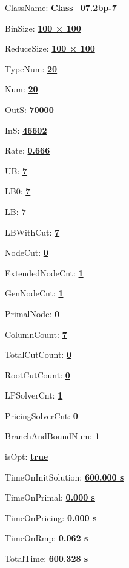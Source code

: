 \documentclass[11pt]{article}
\begin{document}
\pagestyle{empty}


ClassName: \underline{\textbf{Class_07.2bp-7}}
\par
BinSize: \underline{\textbf{100 × 100}}
\par
ReduceSize: \underline{\textbf{100 × 100}}
\par
TypeNum: \underline{\textbf{20}}
\par
Num: \underline{\textbf{20}}
\par
OutS: \underline{\textbf{70000}}
\par
InS: \underline{\textbf{46602}}
\par
Rate: \underline{\textbf{0.666}}
\par
UB: \underline{\textbf{7}}
\par
LB0: \underline{\textbf{7}}
\par
LB: \underline{\textbf{7}}
\par
LBWithCut: \underline{\textbf{7}}
\par
NodeCut: \underline{\textbf{0}}
\par
ExtendedNodeCnt: \underline{\textbf{1}}
\par
GenNodeCnt: \underline{\textbf{1}}
\par
PrimalNode: \underline{\textbf{0}}
\par
ColumnCount: \underline{\textbf{7}}
\par
TotalCutCount: \underline{\textbf{0}}
\par
RootCutCount: \underline{\textbf{0}}
\par
LPSolverCnt: \underline{\textbf{1}}
\par
PricingSolverCnt: \underline{\textbf{0}}
\par
BranchAndBoundNum: \underline{\textbf{1}}
\par
isOpt: \underline{\textbf{true}}
\par
TimeOnInitSolution: \underline{\textbf{600.000 s}}
\par
TimeOnPrimal: \underline{\textbf{0.000 s}}
\par
TimeOnPricing: \underline{\textbf{0.000 s}}
\par
TimeOnRmp: \underline{\textbf{0.062 s}}
\par
TotalTime: \underline{\textbf{600.328 s}}
\par
\newpage


\end{document}
